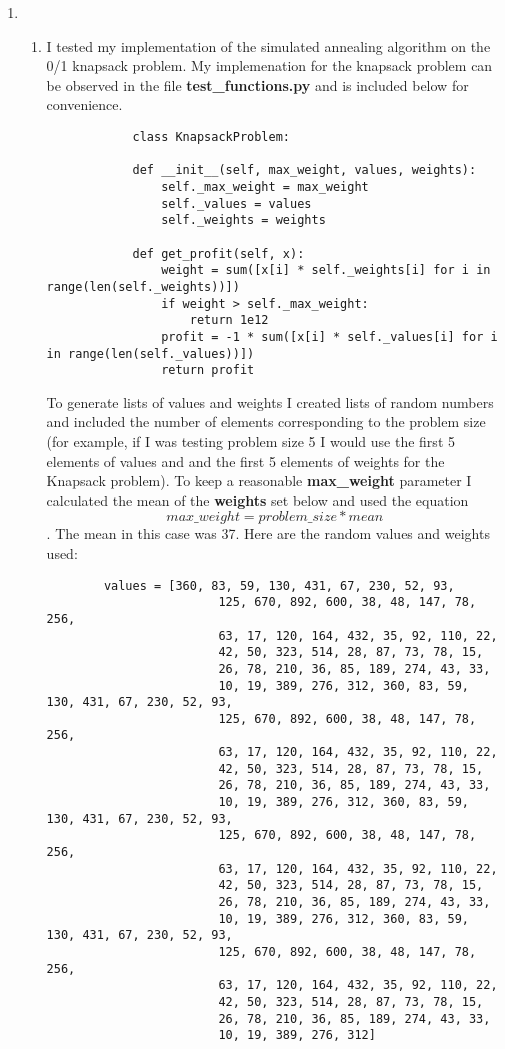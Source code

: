 \documentclass[11pt]{article}
\begin{document}
\begin{enumerate}
\item
\begin{enumerate}
	\item I tested my implementation of the simulated annealing algorithm on the 0/1 knapsack problem. My implemenation for the knapsack problem can be observed in the file {\bf test\_functions.py} and is included below for convenience.
	
	\begin{lstlisting}
			class KnapsackProblem:
	
			def __init__(self, max_weight, values, weights):
				self._max_weight = max_weight
				self._values = values
				self._weights = weights
			
			def get_profit(self, x):
				weight = sum([x[i] * self._weights[i] for i in range(len(self._weights))])
				if weight > self._max_weight:
					return 1e12
				profit = -1 * sum([x[i] * self._values[i] for i in range(len(self._values))])
				return profit
	\end{lstlisting}
	
	To generate lists of values and weights I created lists of random numbers and included the number of elements corresponding to the problem size (for example, if I was testing problem size 5 I would use the first 5 elements of values and and the first 5 elements of weights for the Knapsack problem). To keep a reasonable {\bf max\_weight} parameter I calculated the mean of the {\bf weights} set below and used the equation $$ max\_weight = problem\_size * mean $$. The mean in this case was 37. Here are the random values and weights used:
	\begin{lstlisting}
	    values = [360, 83, 59, 130, 431, 67, 230, 52, 93,
						125, 670, 892, 600, 38, 48, 147, 78, 256,
						63, 17, 120, 164, 432, 35, 92, 110, 22,
						42, 50, 323, 514, 28, 87, 73, 78, 15,
						26, 78, 210, 36, 85, 189, 274, 43, 33,
						10, 19, 389, 276, 312, 360, 83, 59, 130, 431, 67, 230, 52, 93,
						125, 670, 892, 600, 38, 48, 147, 78, 256,
						63, 17, 120, 164, 432, 35, 92, 110, 22,
						42, 50, 323, 514, 28, 87, 73, 78, 15,
						26, 78, 210, 36, 85, 189, 274, 43, 33,
						10, 19, 389, 276, 312, 360, 83, 59, 130, 431, 67, 230, 52, 93,
						125, 670, 892, 600, 38, 48, 147, 78, 256,
						63, 17, 120, 164, 432, 35, 92, 110, 22,
						42, 50, 323, 514, 28, 87, 73, 78, 15,
						26, 78, 210, 36, 85, 189, 274, 43, 33,
						10, 19, 389, 276, 312, 360, 83, 59, 130, 431, 67, 230, 52, 93,
						125, 670, 892, 600, 38, 48, 147, 78, 256,
						63, 17, 120, 164, 432, 35, 92, 110, 22,
						42, 50, 323, 514, 28, 87, 73, 78, 15,
						26, 78, 210, 36, 85, 189, 274, 43, 33,
						10, 19, 389, 276, 312]
	

\end{lstlisting}
\end{enumerate}
\end{enumerate}
\end{document}
